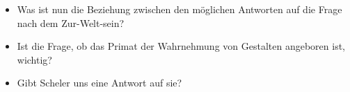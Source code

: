 \documentclass[a4paper, emulatestandardclasses]{scrartcl}
\begin{document}
\begin{itemize}
  \item Was ist nun die Beziehung zwischen den möglichen Antworten auf die Frage nach dem Zur-Welt-sein? 
  \item Ist die Frage, ob das Primat der Wahrnehmung von Gestalten angeboren ist, wichtig?
  \item Gibt Scheler uns eine Antwort auf sie?
\end{itemize}




\end{document}
